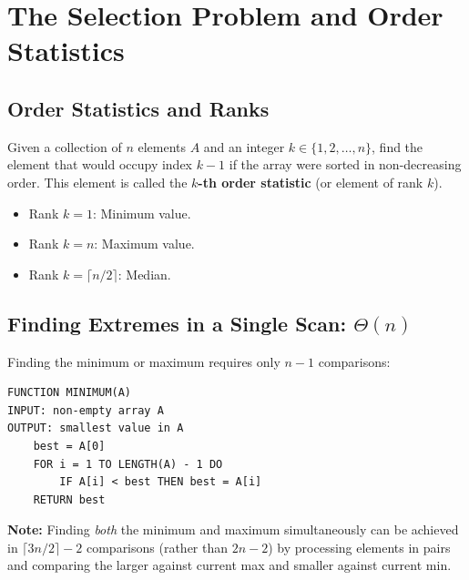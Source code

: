 \documentclass[11pt,a4paper]{article}
\begin{document}
\newpage
\section{The Selection Problem and Order Statistics}

\subsection{Order Statistics and Ranks}
\begin{definitionbox}
Given a collection of $n$ elements $A$ and an integer $k \in \{1, 2, \dots, n\}$, find the element that would occupy index $k - 1$ if the array were sorted in non-decreasing order. This element is called the \textbf{$k$-th order statistic} (or element of rank $k$).
\begin{itemize}[itemsep=1pt]
    \item Rank $k = 1$: Minimum value.
    \item Rank $k = n$: Maximum value.
    \item Rank $k = \lceil n/2 \rceil$: Median.
\end{itemize}
\end{definitionbox}

\subsection{Finding Extremes in a Single Scan: \texorpdfstring{$\Theta(n)$}{Theta(n)}}
Finding the minimum or maximum requires only $n - 1$ comparisons:
\begin{lstlisting}[style=pseudostyle]
FUNCTION MINIMUM(A)
INPUT: non-empty array A
OUTPUT: smallest value in A
    best = A[0]
    FOR i = 1 TO LENGTH(A) - 1 DO
        IF A[i] < best THEN best = A[i]
    RETURN best
\end{lstlisting}
\textbf{Note:} Finding \emph{both} the minimum and maximum simultaneously can be achieved in $\lceil 3n/2 \rceil - 2$ comparisons (rather than $2n - 2$) by processing elements in pairs and comparing the larger against current max and smaller against current min.
\end{document}
